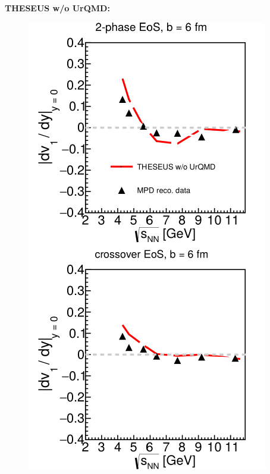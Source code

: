 \documentclass[dvipsnames] {beamer}
\begin{document}
\begin{frame}[shrink=20]
\begin{columns}[c]
    
    \begin{block}{{\tiny \bf \centering THESEUS w/o UrQMD:}}
    \begin{figure}[H]
      \includegraphics[width=1.01\textwidth]{slopeProtons_6fm_urqOFF.pdf}
    \end{figure}
    \end{block}


\end{columns}
\end{frame}
\end{document}
